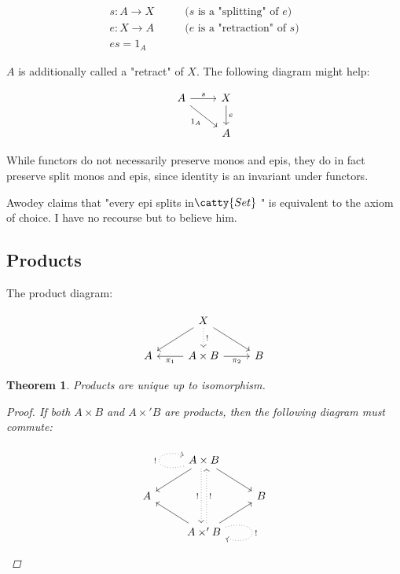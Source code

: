 \documentclass[]{article}
\newtheorem{theorem}{Theorem}
\newcommand{\tfarr}[4][\to]{\ensuremath{#2 : #3 #1 #4}}
\newcommand{\cat}[1]{\ensuremath{\!\! \catty{#1} \,\,}}
\begin{document}
\begin{align*}
  \tfarr{s}{A}{X} &\qquad \text{($s$ is a "splitting" of $e$)} \\
  \tfarr{e}{X}{A} &\qquad \text{($e$ is a "retraction" of $s$)} \\
  es = 1_A &
\end{align*}

$A$ is additionally called a "retract" of $X$. The following diagram might help:

$$\begin{tikzcd}
  A \arrow{r}{s} \arrow[swap]{dr}{1_A} & X \arrow{d}{e} \\
  & A
\end{tikzcd}$$


While functors do not necessarily preserve monos and epis, they do in fact
preserve split monos and epis, since identity is an invariant under functors.

Awodey claims that "every epi splits in \cat{Set}" is equivalent to the axiom of
choice. I have no recourse but to believe him.

\subsection{Products}

The product diagram:

$$\begin{tikzcd}
  & X \arrow{dl} \arrow{dr} \arrow[dotted]{d}{!} & \\
  A & A\times B \arrow{l}{\pi_1} \arrow[swap]{r}{\pi_2} & B
\end{tikzcd}$$

\begin{theorem}
  Products are unique up to isomorphism.

  \begin{proof}
    If both $A \times B$ and $A \times' B$ are products, then the following
    diagram must commute:

$$\begin{tikzcd}
   & A\times B \arrow{dl} \arrow[swap]{dr} \arrow[dotted, swap, shift
   right=1]{dd}{!} \arrow[dotted, loop left]{}{!} & \\
  A & & B \\
   & A\times' B \arrow{ul} \arrow[swap]{ur} \arrow[dotted, swap, shift
   right=1]{uu}{!} \arrow[dotted, loop right]{}{!} &
\end{tikzcd}$$
  \end{proof}
\end{theorem}
\end{document}
